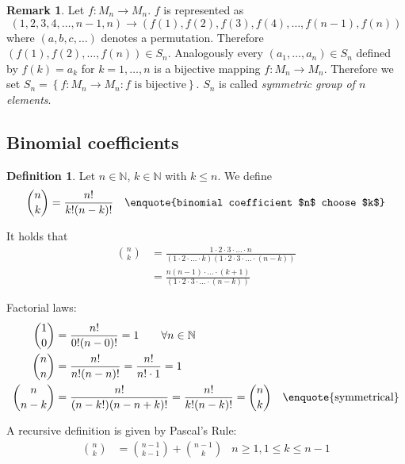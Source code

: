\documentclass[a4paper,landscape,twocolumn]{article}
\theoremstyle{definition}
\newtheorem{defi}{Definition}
\newtheorem{rem}{Remark}
\newcommand\set[1]{\left\{#1\right\}}
\begin{document}

\begin{rem}
  Let $f: M_n \rightarrow M_n$. $f$ is represented as
  \[  (1, 2, 3, 4, \ldots, n-1, n) \rightarrow (f(1), f(2), f(3), f(4), \ldots, f(n-1), f(n))  \]
  where $(a, b, c, \ldots)$ denotes a permutation.
  Therefore $(f(1), f(2), \ldots, f(n)) \in S_n$. Analogously every $(a_1, \ldots, a_n) \in S_n$
  defined by $f(k) = a_k$ for $k=1,\ldots,n$ is a bijective mapping $f: M_n \rightarrow M_n$.
  Therefore we set $S_n = \set{f: M_n \rightarrow M_n: f \text{ is bijective}}$.
  $S_n$ is called \emph{symmetric group of $n$ elements}.
\end{rem}

\subsection{Binomial coefficients}
\begin{defi}
  Let $n \in \mathbb{N}$, $k \in \mathbb{N}$ with $k \leq n$.
  We define \begin{align*}
    \binom{n}{k} &= \frac{n!}{k! (n-k)!}   & \text{\enquote{binomial coefficient $n$ choose $k$}}
  \end{align*}
\end{defi}

It holds that
\begin{align*}
  \binom{n}{k} &= \frac{1\cdot 2\cdot 3\cdot \ldots \cdot n}{(1 \cdot 2 \cdot \ldots \cdot k) (1 \cdot 2 \cdot 3 \cdot \ldots \cdot (n-k))} \\
               &= \frac{n (n-1) \cdot \ldots \cdot (k+1)}{(1 \cdot 2 \cdot 3 \cdot \ldots \cdot (n-k))}
\end{align*}

Factorial laws:
\begin{align*}
  \binom 10 &= \frac{n!}{0! (n-0)!} = 1 \qquad \forall n \in \mathbb{N} \\
  \binom nn &= \frac{n!}{n! (n - n)!} = \frac{n!}{n! \cdot 1} = 1 \\
  \binom{n}{n-k} &= \frac{n!}{(n-k!)(n - n + k)!} = \frac{n!}{k! (n-k)!} = \binom nk & \text{\enquote{symmetrical}}
\end{align*}

A recursive definition is given by Pascal's Rule:
\begin{align*}
    \binom nk &= \binom{n-1}{k-1} + \binom{n-1}{k}
    & n \geq 1, 1 \leq k \leq n-1
\end{align*}
\end{document}
